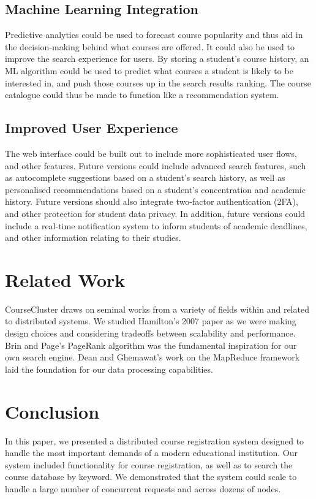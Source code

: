 \documentclass[sigplan, screen, 10pt]{acmart}
\begin{document}
\subsection{Machine Learning Integration}
Predictive analytics could be used to forecast course popularity and thus aid in the decision-making behind what courses are offered. It could also be used to improve the search experience for users. By storing a student's course history, an ML algorithm could be used to predict what courses a student is likely to be interested in, and push those courses up in the search results ranking. The course catalogue could thus be made to function like a recommendation system.

\subsection{Improved User Experience}
The web interface could be built out to include more sophisticated user flows, and other features. Future versions could include advanced search features, such as autocomplete suggestions based on a student's search history, as well as personalised recommendations based on a student's concentration and academic history. Future versions should also integrate two-factor authentication (2FA), and other protection for student data privacy. In addition, future versions could include a real-time notification system to inform students of academic deadlines, and other information relating to their studies.

\section{Related Work}
CourseCluster draws on seminal works from a variety of fields within and related to distributed systems. We studied Hamilton’s 2007 paper \cite{deploying} as we were making design choices and considering tradeoffs between scalability and performance. Brin and Page’s PageRank algorithm \cite{google} was the fundamental inspiration for our own search engine. Dean and Ghemawat’s work on the MapReduce framework \cite{mapreduce} laid the foundation for our data processing capabilities.

\section{Conclusion}

In this paper, we presented a distributed course registration system designed to handle the most important demands of a modern educational institution. Our system included functionality for course registration, as well as to search the course database by keyword. We demonstrated that the system could scale to handle a large number of concurrent requests and across dozens of nodes.
\end{document}
